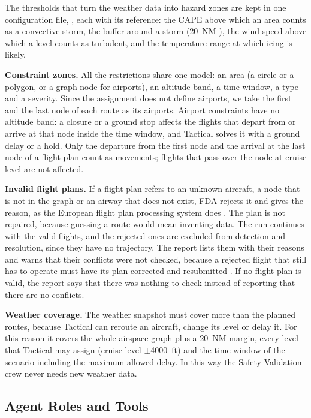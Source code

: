 The thresholds that turn the weather data into hazard zones are kept in one configuration
file, , each with its reference: the CAPE above which an area
counts as a convective storm, the buffer around a storm (20~NM \cite{skybrary_wx_avoidance}),
the wind speed above which a level counts as turbulent, and the temperature range at which
icing is likely.

\textbf{Constraint zones.} All the restrictions share one model: an area (a circle or a
polygon, or a graph node for airports), an altitude band, a time window, a type and a
severity. Since the assignment does not define airports, we take the first and the last
node of each route as its airports. Airport constraints have no altitude band: a closure or
a ground stop affects the flights that depart from or arrive at that node inside the time
window, and Tactical solves it with a ground delay or a hold. Only the departure from the first node and the arrival at the last node of a flight plan
count as movements; flights that pass over the node at cruise level are not affected.

\textbf{Invalid flight plans.} If a flight plan refers to an unknown aircraft, a node that is
not in the graph or an airway that does not exist, FDA rejects it and gives the reason, as
the European flight plan processing system does \cite{eurocontrol_ifpl_spec}. The plan is not
repaired, because guessing a route would mean inventing data. The run continues with the
valid flights, and the rejected ones are excluded from detection and resolution, since they
have no trajectory. The report lists them with their reasons and warns that their conflicts
were not checked, because a rejected flight that still has to operate must have its plan
corrected and resubmitted \cite{eurocontrol_ifpl_spec}. If no flight plan is valid, the report
says that there was nothing to check instead of reporting that there are no conflicts.

\textbf{Weather coverage.} The weather snapshot must cover more than the planned routes,
because Tactical can reroute an aircraft, change its level or delay it. For this reason it
covers the whole airspace graph plus a 20~NM margin, every level that Tactical may assign
(cruise level $\pm$4000~ft) and the time window of the scenario including the maximum
allowed delay. In this way the Safety Validation crew never needs new weather data.

\subsection{Agent Roles and Tools}
\label{sec:roles}


